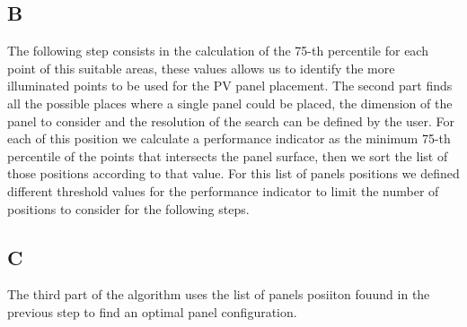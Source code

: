 \subsection{B}
The following step consists in the calculation of the 75-th percentile for each point of this suitable areas, these values allows us to identify the more illuminated points to be used for the PV panel placement. 
The second part finds all the possible places where a single panel could be placed, the dimension of the panel to consider and the resolution of the search can be defined by the user. For each of this position we calculate a performance indicator as the minimum 75-th percentile of the points that intersects the panel surface, then we sort the list of those positions according to that value.
For this list of panels positions we defined different threshold values for the performance indicator to limit the number of positions to consider for the following steps.

\subsection{C}
The third part of the algorithm uses the list of panels posiiton fouund in the previous step to find an optimal panel configuration. 

